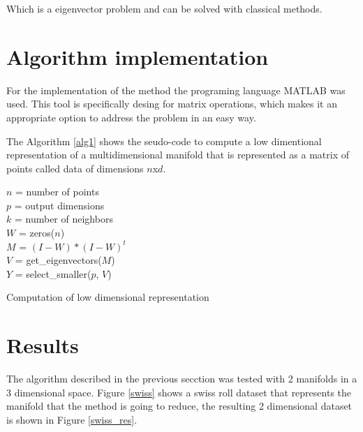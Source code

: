 \documentclass[12pt,journal]{IEEEtran}
\begin{document}
    Which is a eigenvector problem and can be solved with classical methods. 

\section{Algorithm implementation}

For the implementation of the method the programing language MATLAB \cite{matlab}
was used. This tool is specifically desing for matrix operations, which makes it
an appropriate option to address the problem in an easy way.

\vspace{0.25cm}

The Algorithm \ref{alg1} shows the seudo-code to compute a low
dimentional representation of a multidimensional manifold that is represented as
a matrix of points called data of dimensions $n$x$d$.

\begin{algorithm}
    $n$ = number of points\\
    $p$ = output dimensions\\
    $k$ = number of neighbors\\
    \vspace{0.5cm}
    $W$ = zeros($n$)\\
    \vspace{0.5cm}
    $M$ = $(I-W) * (I-W)^t$\\
    $V$ = get\_eigenvectors($M$)\\
    $Y$ = select\_smaller($p$, $V$)

    \vspace{0.5cm}

    \caption{Computation of low dimensional representation}
    \label{alg1}
\end{algorithm}

\section{Results}

The algorithm described in the previous secction was tested with 2 manifolds in
a 3 dimensional space. Figure \ref{swiss} shows a swiss roll dataset that
represents the manifold that the method is going to reduce, the resulting
2 dimensional dataset is shown in Figure \ref{swiss_res}.
\end{document}
